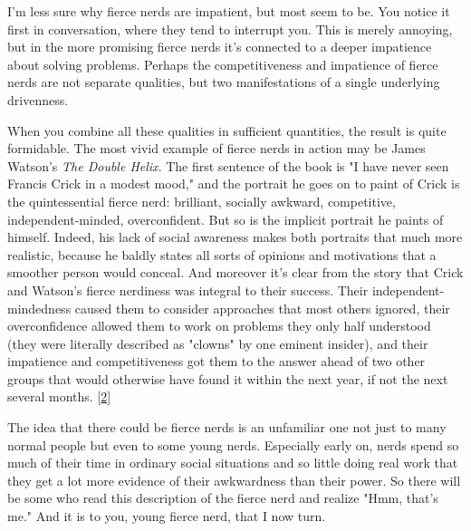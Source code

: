 I'm less sure why fierce
                  nerds are impatient, but most seem to be. You notice it first
                  in conversation, where they tend to interrupt you. This is
                  merely annoying, but in the more promising fierce nerds it's
                  connected to a deeper impatience about solving problems.
                  Perhaps the competitiveness and impatience of fierce nerds are
                  not separate qualities, but two manifestations of a single
                  underlying drivenness.

When you combine all these
                  qualities in sufficient quantities, the result is quite
                  formidable. The most vivid example of fierce nerds in action
                  may be James Watson's \emph{The Double Helix}. The first
                  sentence of the book is "I have never seen Francis Crick in a
                  modest mood," and the portrait he goes on to paint of Crick is
                  the quintessential fierce nerd: brilliant, socially awkward,
                  competitive, independent-minded, overconfident. But so is the
                  implicit portrait he paints of himself. Indeed, his lack of
                  social awareness makes both portraits that much more
                  realistic, because he baldly states all sorts of opinions and
                  motivations that a smoother person would conceal. And moreover
                  it's clear from the story that Crick and Watson's fierce
                  nerdiness was integral to their success. Their
                  independent-mindedness caused them to consider approaches that
                  most others ignored, their overconfidence allowed them to work
                  on problems they only half understood (they were literally
                  described as "clowns" by one eminent insider), and their
                  impatience and competitiveness got them to the answer ahead of
                  two other groups that would otherwise have found it within the
                  next year, if not the next several months.
                  [\href{\#f2n}{2}]

The idea that there could be fierce nerds is an
                  unfamiliar one not just to many normal people but even to some
                  young nerds. Especially early on, nerds spend so much of their
                  time in ordinary social situations and so little doing real
                  work that they get a lot more evidence of their awkwardness
                  than their power. So there will be some who read this
                  description of the fierce nerd and realize "Hmm, that's me."
                  And it is to you, young fierce nerd, that I now turn.

